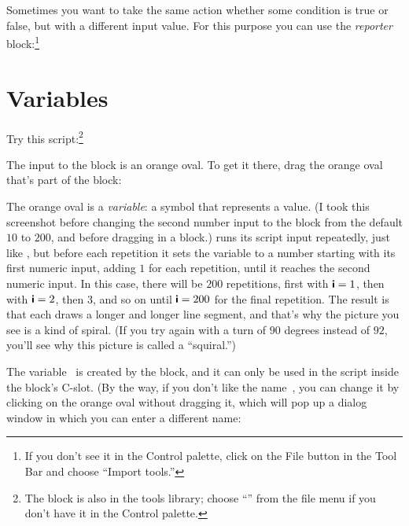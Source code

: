 \documentclass{report}
\begin{document}
Sometimes you want to take the same action whether some condition is true or false, but with a different input value. For this purpose you can use the \emph{reporter}  block:\footnote{\onehalfspacing If you don't see it in the Control palette, click on the File button  in the Tool Bar and choose ``Import tools.''}\nopagebreak


\section{Variables}

Try this script:\footnote{The  block is also in the tools library; choose ``'' from the file menu if you don't have it in the Control palette.}\nopagebreak


The input to the  block is an orange oval. To get it there, drag the orange oval that's part of the  block:\nopagebreak


The orange oval is a \emph{variable}: a symbol that represents a value. (I took this screenshot before changing the second number input to the  block from the default $10$ to $200$, and before dragging in a  block.)  runs its script input repeatedly, just like , but before each repetition it sets the variable  to a number starting with its first numeric input, adding $1$ for each repetition, until it reaches the second numeric input. In this case, there will be $200$ repetitions, first with $\textsf{\textbf{i}}=1$, then with $\textsf{\textbf{i}}=2$, then $3$, and so on until $\textsf{\textbf{i}}=200$ for the final repetition. The result is that each  draws a longer and longer line segment, and that's why the picture you see is a kind of spiral. (If you try again with a turn of $90$ degrees instead of $92$, you'll see why this picture is called a ``squiral.'')

The variable~ is created by the  block, and it can only be used in the script inside the block's C-slot. (By the way, if you don't like the name~, you can change it by clicking on the orange oval without dragging it, which will pop up a dialog window in which you can enter a different name:\nopagebreak

\end{document}
